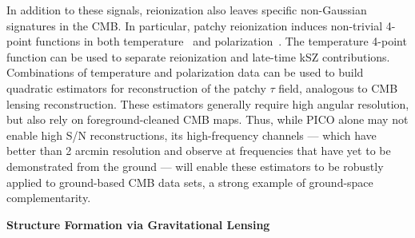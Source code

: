 \documentclass[PICOReport.tex]{subfiles}
\begin{document}
In addition to these signals, reionization also leaves specific non-Gaussian signatures in the CMB.  In particular, patchy reionization 
induces non-trivial 4-point functions in both temperature~\citep{SmithFerraro2017} and polarization~\citep{DvorkinSmith2008}.  The 
temperature 4-point function can be used to separate reionization and late-time kSZ contributions.  Combinations of temperature and 
polarization data can be used to build quadratic estimators for reconstruction of the patchy $\tau$ field, analogous to CMB lensing 
reconstruction.  These estimators generally require high angular resolution, but also rely on foreground-cleaned CMB maps.  Thus, 
while PICO alone may not enable high S/N reconstructions, its high-frequency channels --- which have better than 2 arcmin 
resolution and observe at frequencies that have yet to be demonstrated from the ground --- will enable these estimators to be 
robustly applied to ground-based CMB data sets, a strong example of ground-space complementarity.



{\bf Structure Formation via Gravitational Lensing}
\end{document}
